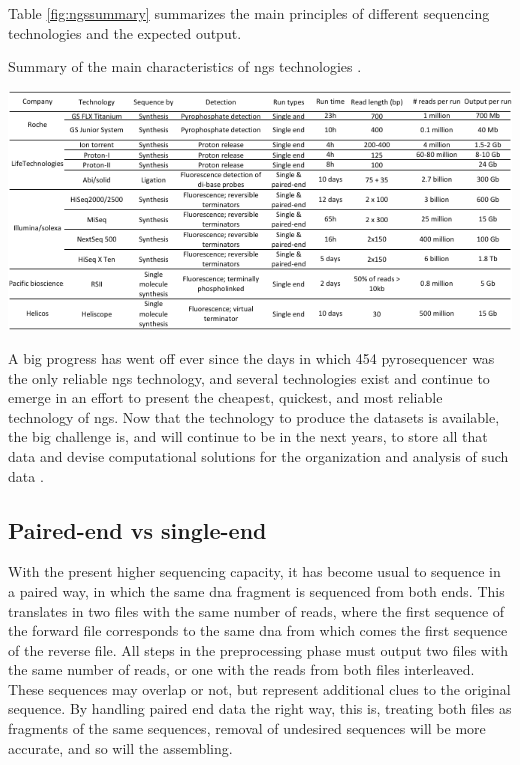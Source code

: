 \documentclass[
  oneside,
  11pt, a4paper,
  footinclude=true,
  headinclude=true,
  cleardoublepage=empty
]{scrbook}
\begin{document}
    Table \ref{fig:ngssummary} summarizes the main principles of different sequencing technologies and the expected output.

    \begin{table}
    \caption{Summary of the main characteristics of \gls{ngs} technologies \citep{Buermans2014}.}
    \includegraphics[width=\columnwidth]{NGStable.pdf}
    \label{fig:ngssummary}
    \end{table}
    
    A big progress has went off ever since the days in which 454 pyrosequencer was the only reliable \gls{ngs} technology, and several technologies exist and continue to emerge in an effort to present the cheapest, quickest, and most reliable technology of \gls{ngs}. Now that the technology to produce the datasets is available, the big challenge is, and will continue to be in the next years, to store all that data and devise computational solutions for the organization and analysis of such data \citep{Illumina2015, Buermans2014, Bahassi2014, VanDijk2014}.
    	
	\subsection{Paired-end vs single-end}
    
    With the present higher sequencing capacity, it has become usual to sequence in a paired way, in which the same \gls{dna} fragment is sequenced from both ends. This translates in two files with the same number of reads, where the first sequence of the forward file corresponds to the same \gls{dna} from which comes the first sequence of the reverse file. All steps in the preprocessing phase must output two files with the same number of reads, or one with the reads from both files interleaved. These sequences may overlap or not, but represent additional clues to the original sequence. By handling paired end data the right way, this is, treating both files as fragments of the same sequences, removal of undesired sequences will be more accurate, and so will the assembling.
    
\end{document}
